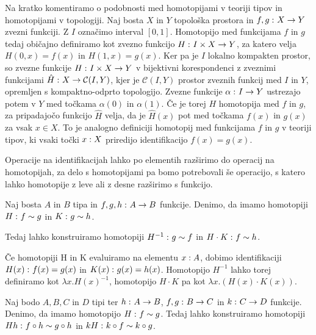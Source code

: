 \begin{opomba}
  Na kratko komentiramo o podobnosti med homotopijami v teoriji tipov in homotopijami v
  topologiji. Naj bosta \(X\) in \(Y\) topološka prostora in
  \(f, g \,\colon X \to Y\) zvezni
  funkciji. Z \(I\) označimo interval \([0, 1]\). Homotopijo med funkcijama \(f\) in \(g\)
  tedaj običajno definiramo kot zvezno funkcijo \(H \,\colon I \times X \to Y\), za katero velja
  \(H(0, x) = f(x)\) in \(H(1, x) = g(x)\). Ker pa je \(I\) lokalno kompakten prostor, so
  zvezne funkcije \(H \,\colon I \times X \to Y\) v bijektivni korespondenci z zveznimi funkcijami
  \(\hat{H} \,\colon X \to \mathcal{C}(I, Y)\), kjer je \(\mathcal{C}(I, Y)\) prostor zveznih funkcij med \(I\) in
  \(Y\), opremljen s kompaktno-odprto topologijo. Zvezne funkcije \(\alpha \,\colon I \to Y\)
  ustrezajo potem v \(Y\) med točkama \(\alpha(0)\) in \(\alpha(1)\). Če je torej \(H\)
  homotopija med \(f\) in \(g\), za pripadajočo funkcijo \(\hat{H}\) velja, da je
  \(\hat{H}(x)\) pot med točkama \(f(x)\) in \(g(x)\) za vsak \(x \in X\). To je analogno
  definiciji homotopij med funkcijama \(f\) in \(g\) v teoriji tipov, ki vsaki točki
  \(x : X\) priredijo identifikacijo \(f(x) = g(x)\).
\end{opomba}

Operacije na identifikacijah lahko po elementih razširimo do operacij na homotopijah,
za delo s homotopijami pa bomo potrebovali še operacijo, s katero lahko homotopije z leve ali z desne razširimo s funkcijo.

\begin{trditev}
  Naj bosta \(A\) in \(B\) tipa in \(f, g, h \,\colon A \to B\) funkcije. Denimo, da imamo
  homotopiji \(H \,\colon f \sim g\) in \(K \,\colon g \sim h\).

  Tedaj lahko konstruiramo homotopiji \(H^{-1} \,\colon g \sim f\) in \(H \cdot K \,\colon f \sim h\).
\end{trditev}

\begin{dokaz}
  Če homotopiji H in K evaluiramo na elementu \(x : A\), dobimo identifikaciji
  \(H(x) \,\colon f(x) = g(x)\) in \(K(x) \,\colon g(x) = h(x)\). Homotopijo \(H^{-1}\) lahko
  torej definiramo kot \(\lambda x. H(x)^{-1}\), homotopijo \(H \cdot K\) pa kot \(\lambda x.(H(x) \cdot K(x))\).
\end{dokaz}

\begin{trditev}
  Naj bodo \(A, B, C\) in \(D\) tipi ter \(h \,\colon A \to B\), \(f, g \,\colon B \to C\) in
  \(k \,\colon C \to D\) funkcije. Denimo, da imamo homotopijo \(H \,\colon f \sim g\).
  Tedaj lahko konstruiramo homotopiji \(Hh \,\colon f \circ h \sim g \circ h\) in
  \(kH \,\colon k \circ f \sim k \circ g\).
\end{trditev}

